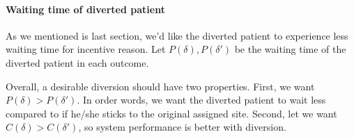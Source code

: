 \paragraph{Waiting time of diverted patient} As we mentioned is last section, we'd like the diverted patient to experience less waiting time for incentive reason. Let $P(\delta), P(\delta')$ be the waiting time of the diverted patient in each outcome.

Overall, a desirable diversion should have two properties. First, we want $P(\delta) > P(\delta')$.
In order words, we want the diverted patient to wait less compared to if he/she sticks to the original
assigned site. Second, let we want $C(\delta) > C(\delta')$, so system performance is better with diversion.
